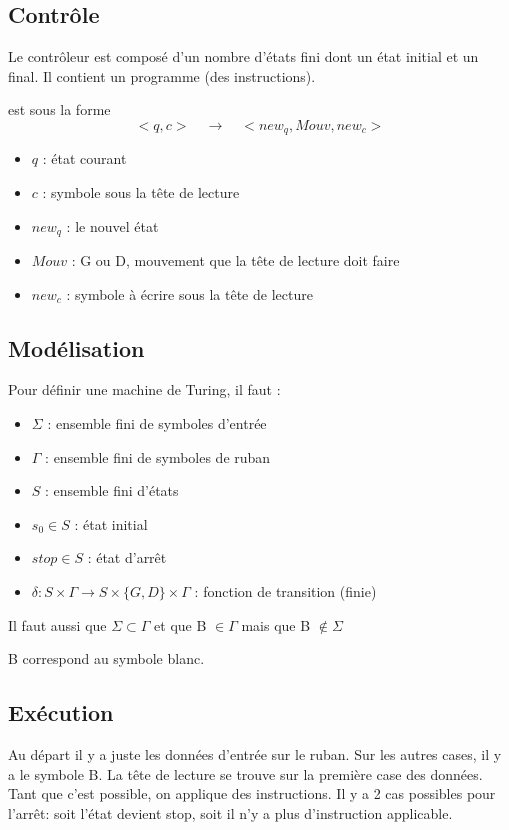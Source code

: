 \subsection{Contrôle}
\label{ssub:contr_le}
Le contrôleur est composé d'un nombre d'états fini dont un état initial et un
final. Il contient un programme (des instructions).

\begin{mydef} est sous la forme
	$$<q,c> \quad \rightarrow \quad <new_q, Mouv, new_c>$$
	\begin{itemize}
		\item $q$ : état courant
		\item $c$ : symbole sous la tête de lecture
        \item $new_q$ : le nouvel état
		\item $Mouv$ : G ou D, mouvement que la tête de lecture doit faire
        \item $new_c$ : symbole à écrire sous la tête de lecture
	\end{itemize}
\end{mydef}


\subsection{Modélisation}
Pour définir une machine de Turing, il faut :
\begin{itemize}
	\item $\Sigma$ : ensemble fini de symboles d'entrée
	\item $\Gamma$ : ensemble fini de symboles de ruban
	\item $S$ : ensemble fini d'états
	\item $s_0 \in S$ : état initial
	\item $stop \in S$ : état d'arrêt
	\item $\delta : S \times \Gamma \rightarrow S \times \{G,D\}
	\times \Gamma$ : fonction de transition (finie)
\end{itemize}
Il faut aussi que $\Sigma \subset \Gamma$ et que B $\in \Gamma$ mais que B
$\notin \Sigma$

\begin{mydef}
		B correspond au symbole blanc.
\end{mydef}

\subsection{Exécution}
Au départ il y a juste les données d'entrée sur le ruban. Sur les autres cases, il y a
le symbole B. La tête de lecture se trouve sur la première case des données. Tant que
c'est possible, on applique des instructions. Il y a 2 cas possibles pour l'arrêt: soit
l'état devient stop, soit il n'y a plus d'instruction applicable.


